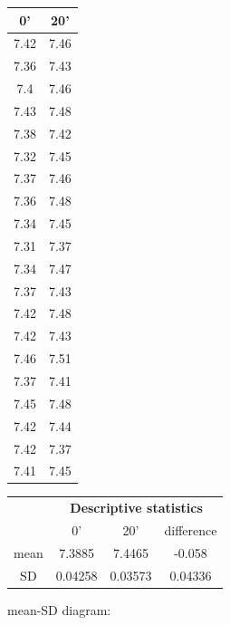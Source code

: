 	\begin{minipage}{0.2\textwidth}
	\flushright\small
		\begin{tabular}{cc}
		\toprule
		0’&20’\\
		\midrule
			7.42&7.46\\
			7.36&7.43\\
			7.4 &7.46\\
			7.43&7.48\\
			7.38&7.42\\
			7.32&7.45\\
			7.37&7.46\\
			7.36&7.48\\
			7.34&7.45\\
			7.31&7.37\\
			7.34&7.47\\
			7.37&7.43\\
			7.42&7.48\\
			7.42&7.43\\
			7.46&7.51\\
			7.37&7.41\\
			7.45&7.48\\
			7.42&7.44\\
			7.42&7.37\\
			7.41&7.45\\
		\bottomrule
		\end{tabular}
	\end{minipage}
	\begin{minipage}{0.7\textwidth}
		\centering
		\begin{tabular}{cccc}
		\toprule
		& \multicolumn{3}{c}{\textbf{Descriptive statistics}}	\\
		
				& 0’		& 20’ 		& difference\\
			\midrule
		mean 	& 7.3885	& 7.4465	& -0.058\\
		SD		& 	0.04258	& 	0.03573	& 0.04336\\
		\bottomrule
		\end{tabular}\bigskip		
		
		mean-SD diagram:
		
		\vspace{12em}
	\end{minipage}	
		
